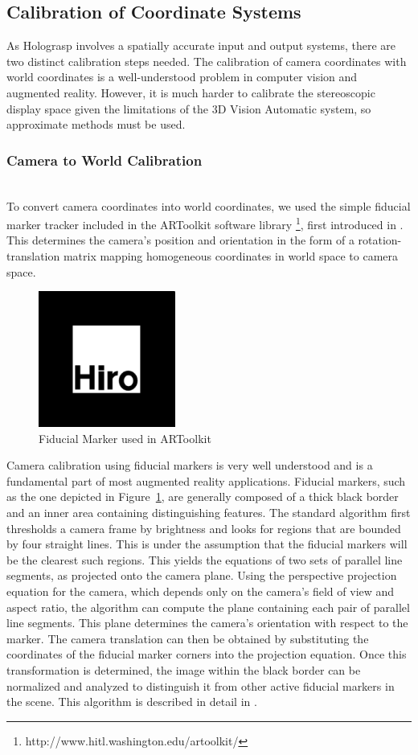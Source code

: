 \documentclass[pageno]{jpaper}
\begin{document}
\subsection{Calibration of Coordinate Systems}
As Holograsp involves a spatially accurate input and output systems, there are two distinct calibration steps needed. The calibration
of camera coordinates with world coordinates is a well-understood problem in computer vision and augmented reality.
However, it is much harder to calibrate the stereoscopic display space given the limitations of the 3D Vision Automatic
system, so approximate methods must be used.
\subsubsection{Camera to World Calibration}$ $\\
To convert camera coordinates into world coordinates, we used the simple fiducial marker tracker included in the ARToolkit software
library \footnote{http://www.hitl.washington.edu/artoolkit/}, first introduced in \cite{artoolkit}. This determines the camera's position
and orientation in the form of a rotation-translation matrix mapping homogeneous coordinates in world space to camera space.

\begin{figure}
\centering
\includegraphics[width=0.4\textwidth]{figures/hiro.png}
\caption{Fiducial Marker used in ARToolkit}
\label{fig:hiro}
\end{figure}

Camera calibration using fiducial markers is very well understood and is a fundamental part of most augmented reality applications. Fiducial
markers, such as the one depicted in Figure~\ref{fig:hiro}, are generally composed of a thick black border and an inner area
containing distinguishing features. The standard algorithm first thresholds a camera frame by brightness and looks for regions that are bounded by four straight lines.
This is under the assumption that the fiducial markers will be the clearest such regions.
This yields the equations of two sets of parallel line segments, as projected onto the camera plane. Using the perspective projection equation
for the camera, which depends only on the camera's field of view and aspect ratio, the algorithm can compute the plane containing each pair of
parallel line segments. This plane determines the camera's orientation with respect to the marker. The camera translation can then be
obtained by substituting the coordinates of the fiducial marker corners into the projection equation. Once this transformation is determined, the image within
the black border can be normalized and analyzed to distinguish it from other active fiducial markers in the scene. This algorithm is described in
detail in \cite{kato1999marker}.
\end{document}
